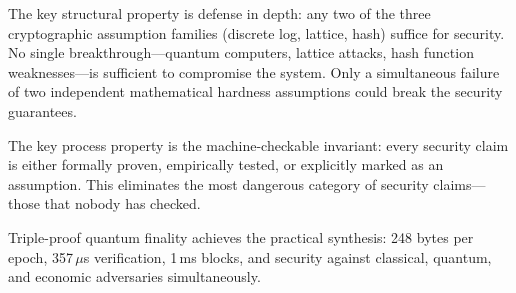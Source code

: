 \documentclass[11pt,a4paper]{article}
\begin{document}
The key structural property is defense in depth: any two of the three cryptographic
assumption families (discrete log, lattice, hash) suffice for security. No single
breakthrough---quantum computers, lattice attacks, hash function weaknesses---is
sufficient to compromise the system. Only a simultaneous failure of two independent
mathematical hardness assumptions could break the security guarantees.

The key process property is the machine-checkable invariant: every security claim is
either formally proven, empirically tested, or explicitly marked as an assumption.
This eliminates the most dangerous category of security claims---those that nobody
has checked.

Triple-proof quantum finality achieves the practical synthesis: 248 bytes per epoch,
357\,$\mu$s verification, 1\,ms blocks, and security against classical, quantum,
and economic adversaries simultaneously.
\end{document}
